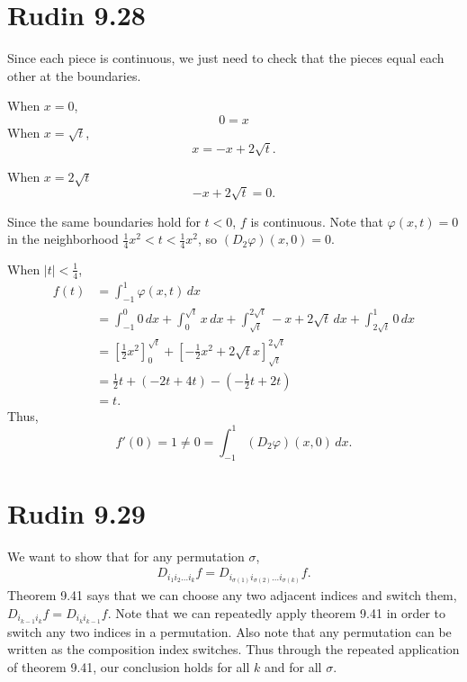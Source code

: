 \documentclass{article}
\begin{document}
\section*{Rudin 9.28}
Since each piece is continuous, we just need to check that 
the pieces equal each other at the boundaries.

When $x = 0$,
\[
  0 = x
\]
When $x = \sqrt{t}$,
\[
  x = -x + 2\sqrt{t}.
\]

When $x = 2\sqrt{t}$
\[
  -x + 2\sqrt{t} = 0.
\]

Since the same boundaries hold for $t<0$, $f$ is continuous.
Note that $\varphi(x,t) = 0$ in the neighborhood 
$\frac{1}{4}x^2< t < \frac{1}{4} x^2$, so $(D_2 \varphi)(x,0) = 0$.

When $|t| < \frac{1}{4}$,
\begin{align*}
  f(t) &= \int_{-1}^1 \varphi(x,t) \,dx \\
  &= \int_{-1}^0 0 \,dx + \int_0^{\sqrt{t}} x \,dx + \int_{\sqrt{t}}^{2\sqrt{t}} -x + 2\sqrt{t} \,dx + \int_{2\sqrt{t}}^1 0 \,dx \\
  &= \left[\frac{1}{2}x^2\right]_0^{\sqrt{t}} + \left[-\frac{1}{2}x^2 + 2\sqrt{t} x\right]_{\sqrt{t}}^{2\sqrt{t}} \\
  &=\frac{1}{2}t + (-2t+4t) - \left(-\frac{1}{2}t + 2t\right) \\
  &= t.
\end{align*}
Thus,
\[
  f'(0) = 1 \neq 0 = \int_{-1}^1 (D_2 \varphi)(x,0) \,dx.
\]
\newpage 

\section*{Rudin 9.29}
We want to show that for any permutation $\sigma$, 
\begin{align*}
  D_{i_1 i_2 \ldots i_k} f = D_{i_{\sigma(1)} i_{\sigma(2)} \ldots i_{\sigma(k)}} f.
\end{align*}
Theorem 9.41 says that we can choose any two adjacent indices and switch them,
$D_{i_{k-1} i_k} f =D_{i_k i_{k-1} } f$.
Note that we can repeatedly apply theorem 9.41 in order to switch any two indices
in a permutation.
Also note that any permutation can be written as the composition index switches.
Thus through the repeated application of theorem 9.41,
our conclusion holds for all $k$ and for all $\sigma$.
\newpage 
\end{document}
